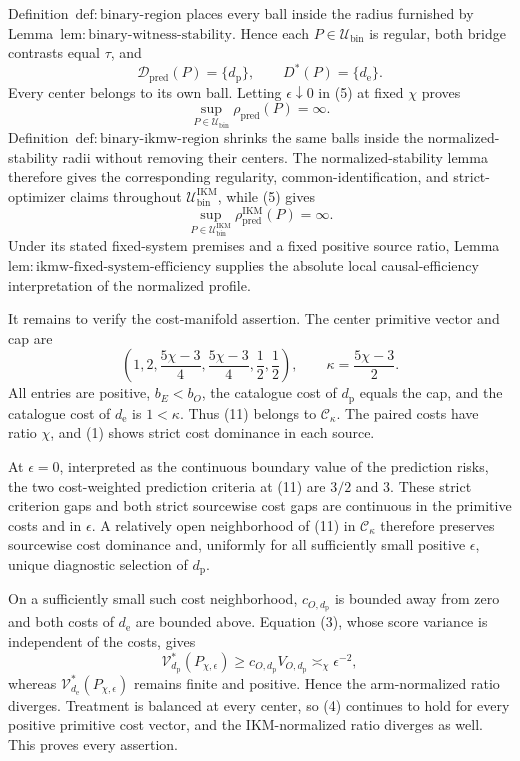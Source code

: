 Definition~\(\mathrm{def{:}binary\text{-}region}\) places every ball inside the radius furnished by Lemma~\(\mathrm{lem{:}binary\text{-}witness\text{-}stability}\). Hence each \(P\in\mathcal U_{\mathrm{bin}}\) is regular, both bridge contrasts equal \(\tau\), and
\[
 \mathcal D_{\mathrm{pred}}(P)=\{d_{\mathrm p}\},
 \qquad
 D^*(P)=\{d_{\mathrm e}\}.                            \tag{8}
\]
Every center belongs to its own ball. Letting \(\epsilon\downarrow0\) in (5) at fixed \(\chi\) proves
\[
 \sup_{P\in\mathcal U_{\mathrm{bin}}}\rho_{\mathrm{pred}}(P)=\infty. \tag{9}
\]
Definition~\(\mathrm{def{:}binary\text{-}ikmw\text{-}region}\) shrinks the same balls inside the normalized-stability radii without removing their centers. The normalized-stability lemma therefore gives the corresponding regularity, common-identification, and strict-optimizer claims throughout \(\mathcal U_{\mathrm{bin}}^{\mathrm{IKM}}\), while (5) gives
\[
 \sup_{P\in\mathcal U_{\mathrm{bin}}^{\mathrm{IKM}}}
 \rho_{\mathrm{pred}}^{\mathrm{IKM}}(P)=\infty.       \tag{10}
\]
Under its stated fixed-system premises and a fixed positive source ratio, Lemma~\(\mathrm{lem{:}ikmw\text{-}fixed\text{-}system\text{-}efficiency}\) supplies the absolute local causal-efficiency interpretation of the normalized profile.

It remains to verify the cost-manifold assertion. The center primitive vector and cap are
\[
 \left(1,2,\frac{5\chi-3}{4},\frac{5\chi-3}{4},
 \frac12,\frac12\right),
 \qquad \kappa=\frac{5\chi-3}{2}.                     \tag{11}
\]
All entries are positive, \(b_E<b_O\), the catalogue cost of \(d_{\mathrm p}\) equals the cap, and the catalogue cost of \(d_{\mathrm e}\) is \(1<\kappa\). Thus (11) belongs to \(\mathcal C_\kappa\). The paired costs have ratio \(\chi\), and (1) shows strict cost dominance in each source.

At \(\epsilon=0\), interpreted as the continuous boundary value of the prediction risks, the two cost-weighted prediction criteria at (11) are \(3/2\) and \(3\). These strict criterion gaps and both strict sourcewise cost gaps are continuous in the primitive costs and in \(\epsilon\). A relatively open neighborhood of (11) in \(\mathcal C_\kappa\) therefore preserves sourcewise cost dominance and, uniformly for all sufficiently small positive \(\epsilon\), unique diagnostic selection of \(d_{\mathrm p}\).

On a sufficiently small such cost neighborhood, \(c_{O,d_{\mathrm p}}\) is bounded away from zero and both costs of \(d_{\mathrm e}\) are bounded above. Equation (3), whose score variance is independent of the costs, gives
\[
 \mathcal V_{d_{\mathrm p}}^*(P_{\chi,\epsilon})
 \ge c_{O,d_{\mathrm p}}V_{O,d_{\mathrm p}}
 \asymp_\chi\epsilon^{-2},                            \tag{12}
\]
whereas \(\mathcal V_{d_{\mathrm e}}^*(P_{\chi,\epsilon})\) remains finite and positive. Hence the arm-normalized ratio diverges. Treatment is balanced at every center, so (4) continues to hold for every positive primitive cost vector, and the IKM-normalized ratio diverges as well. This proves every assertion.